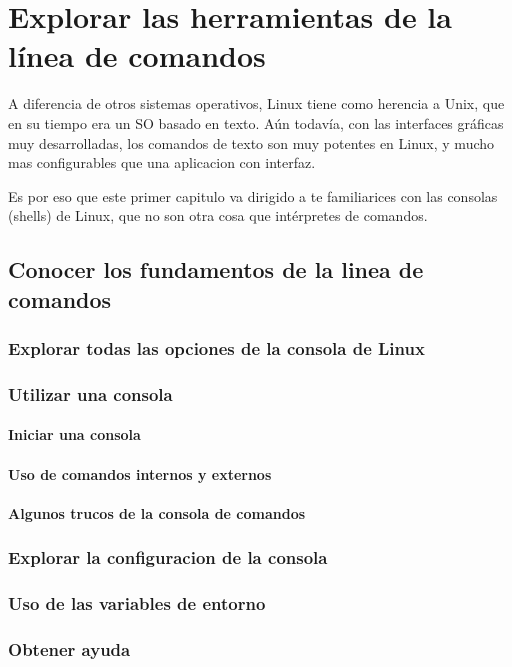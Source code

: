\chapter{Explorar las herramientas de la línea de comandos}
\label{cha:Shell}

A diferencia de otros sistemas operativos, Linux tiene como herencia a Unix,
 que en su tiempo era un SO basado en texto.
Aún todavía, con las interfaces gráficas muy desarrolladas, los comandos de texto
son muy potentes en Linux, y mucho mas configurables que una aplicacion con interfaz.

Es por eso que este primer capitulo va dirigido a te familiarices con las consolas (shells)
de Linux, que no son otra cosa que intérpretes de comandos.


\section*{Conocer los fundamentos de la linea de comandos}


\subsection*{Explorar todas las opciones de la consola de Linux}
		 	

\subsection*{Utilizar una consola}



\subsubsection*{Iniciar una consola}
			 	

\subsubsection*{Uso de comandos internos y externos}
			 	

\subsubsection*{Algunos trucos de la consola de comandos}


		



\subsection*{Explorar la configuracion de la consola}
			


\subsection*{Uso de las variables de entorno}
			

\subsection*{Obtener ayuda}




